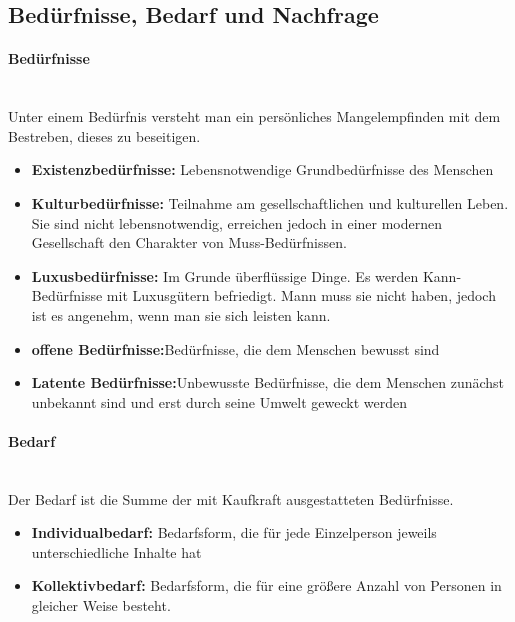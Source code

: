 
\subsection{Bedürfnisse, Bedarf und Nachfrage}

\paragraph{Bedürfnisse}~\\
Unter einem Bedürfnis versteht man ein persönliches Mangelempfinden mit dem Bestreben, dieses zu beseitigen.

\begin{itemize}
	\item \textbf{Existenzbedürfnisse:} Lebensnotwendige Grundbedürfnisse des Menschen
	\item \textbf{Kulturbedürfnisse:} Teilnahme am gesellschaftlichen und kulturellen Leben. Sie sind nicht lebensnotwendig, erreichen jedoch in einer modernen Gesellschaft den Charakter von Muss-Bedürfnissen.
	\item \textbf{Luxusbedürfnisse:} Im Grunde überflüssige Dinge. Es werden Kann-Bedürfnisse mit Luxusgütern befriedigt. Mann muss sie nicht haben, jedoch ist es angenehm, wenn man sie sich leisten kann.
	\item \textbf{offene Bedürfnisse:}Bedürfnisse, die dem Menschen bewusst sind
	\item \textbf{Latente Bedürfnisse:}Unbewusste Bedürfnisse, die dem Menschen zunächst unbekannt sind und erst durch seine Umwelt geweckt werden
\end{itemize}
	
	
\paragraph{Bedarf}~\\
Der Bedarf ist die Summe der mit Kaufkraft ausgestatteten Bedürfnisse.

\begin{itemize}
	\item \textbf{Individualbedarf:} Bedarfsform, die für jede Einzelperson jeweils unterschiedliche Inhalte hat
	\item \textbf{Kollektivbedarf:} Bedarfsform, die für eine größere Anzahl von Personen in gleicher Weise besteht.
\end{itemize}
	
